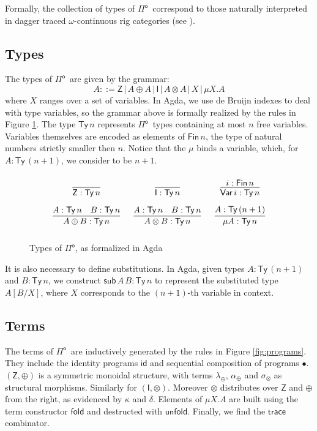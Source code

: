 \documentclass[runningheads,a4paper]{llncs}
\newcommand{\Pio}{\ensuremath{\mathsf{\Pi}^{\mathsf{o}}}}
\newcommand{\Ty}{\mathsf{Ty}}
\newcommand{\Var}{\mathsf{Var}}
\newcommand{\id}{\mathsf{id}}
\newcommand{\fold}{\mathsf{fold}}
\newcommand{\unfold}{\mathsf{unfold}}
\newcommand{\sub}{\mathsf{sub}}
\newcommand{\trace}{\ensuremath{\mathsf{trace}}}
\newcommand{\Z}{\mathsf{Z}}
\newcommand{\I}{\mathsf{I}}
\begin{document}
Formally, the collection of types of \Pio\ correspond to those naturally
interpreted in dagger traced $\omega$-continuous rig categories (see
\cite{Karvonen19}).

\subsection{Types}

The types of \Pio\ are given by the grammar:
\[
A ::= \Z \, | \,A \oplus A \, | \,\I \,| \,A \otimes A \,| \,X \,|
\,\mu X.A 
\]
where $X$ ranges over a set of variables. In Agda, we use de Bruijn
indexes to deal with type variables, so the grammar above is formally
realized by the rules in Figure \ref{fig:types}. The type $\Ty\,n$
represents \Pio\ types containing at most $n$ free
variables. Variables themselves are encoded as elements of
$\mathsf{Fin}\,n$, the type of natural numbers strictly smaller then
$n$. Notice that the $\mu$ binds a variable, which, for $A : \Ty\,(n +
1)$, we consider to be $n + 1$.

\begin{figure}
\[
\arraycolsep=8pt\def\arraystretch{2.8}
\begin{array}{ccc}
\infer{\Z : \Ty\,n}{} 
& \infer{\I : \Ty\,n}{}
& \infer{\Var\,i : \Ty\,n}{i : \mathsf{Fin}\,n}  \\
\infer{A \oplus B : \Ty\,n}{A : \Ty\,n & B : \Ty\,n}
& \infer{A \otimes B : \Ty\,n}{A : \Ty\,n & B : \Ty\,n}
& \infer{\mu A : \Ty\,n}{A : \Ty\,(n+1)} 
\end{array}
\]
\caption{Types of \Pio, as formalized in Agda}
\label{fig:types}
\end{figure}

It is also necessary to define substitutions. In Agda, given
types $A : \Ty\,(n+1)$ and $B : \Ty\,n$, we construct
$\sub\,A\,B : \Ty\,n$ to represent the substituted type $A[B/X]$,
where $X$ corresponds to the $(n+1)$-th variable in context.



\subsection{Terms}

The terms of \Pio\ are inductively generated by the rules in Figure
\ref{fig:programs}. They include the identity programs $\id$ and
sequential composition of programs $\bullet$. $(\Z,\oplus)$ is a
symmetric monoidal structure, with terms $\lambda_\oplus$,
$\alpha_\oplus$ and $\sigma_\otimes$ as structural
morphisms. Similarly for $(\I,\otimes)$. Moreover $\otimes$
distributes over $\Z$ and $\oplus$ from the right, as evidenced by  $\kappa$
and $\delta$. Elements of $\mu X.A$ are built using the term
constructor $\fold$ and destructed with $\unfold$. Finally, we find the
$\trace$ combinator. 
\end{document}
